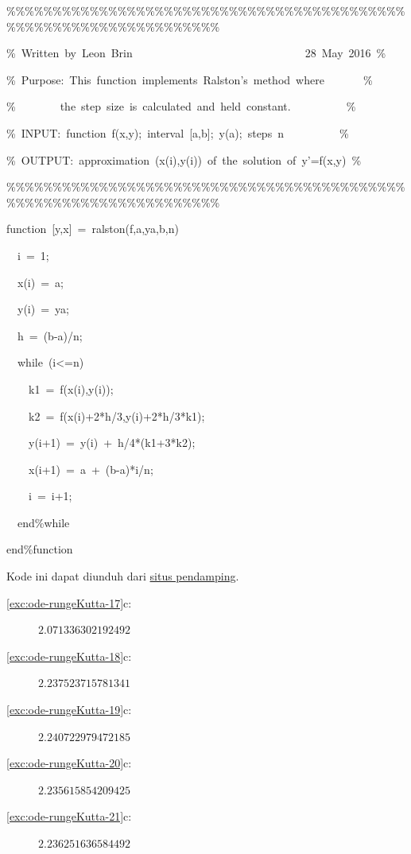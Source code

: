 \begin{lyxcode}
\%\%\%\%\%\%\%\%\%\%\%\%\%\%\%\%\%\%\%\%\%\%\%\%\%\%\%\%\%\%\%\%\%\%\%\%\%\%\%\%\%\%\%\%\%\%\%\%\%\%\%\%\%\%\%\%\%\%\%\%\%\%\%\%\%\%

\%~Written~by~Leon~Brin~~~~~~~~~~~~~~~~~~~~~~~~~~~~~~~28~May~2016~\%

\%~Purpose:~This~function~implements~Ralston's~method~where~~~~~~~\%

\%~~~~~~~~the~step~size~is~calculated~and~held~constant.~~~~~~~~~~\%

\%~INPUT:~function~f(x,y);~interval~{[}a,b{]};~y(a);~steps~n~~~~~~~~~~\%

\%~OUTPUT:~approximation~(x(i),y(i))~of~the~solution~of~y'=f(x,y)~\%

\%\%\%\%\%\%\%\%\%\%\%\%\%\%\%\%\%\%\%\%\%\%\%\%\%\%\%\%\%\%\%\%\%\%\%\%\%\%\%\%\%\%\%\%\%\%\%\%\%\%\%\%\%\%\%\%\%\%\%\%\%\%\%\%\%\%

function~{[}y,x{]}~=~ralston(f,a,ya,b,n)

~~i~=~1;

~~x(i)~=~a;

~~y(i)~=~ya;

~~h~=~(b-a)/n;

~~while~(i<=n)

~~~~k1~=~f(x(i),y(i));

~~~~k2~=~f(x(i)+2{*}h/3,y(i)+2{*}h/3{*}k1);

~~~~y(i+1)~=~y(i)~+~h/4{*}(k1+3{*}k2);

~~~~x(i+1)~=~a~+~(b-a){*}i/n;

~~~~i~=~i+1;

~~end\%while

end\%function~

\textrm{Kode ini dapat diunduh dari \href{http://lqbrin.github.io/tea-time-numerical/ancillaries.html}{situs pendamping}.}
\end{lyxcode}
\begin{description}
\item [{\ref{exc:ode-rungeKutta-17}c:}] $2.071336302192492$
\item [{\ref{exc:ode-rungeKutta-18}c:}] $2.237523715781341$
\item [{\ref{exc:ode-rungeKutta-19}c:}] $2.240722979472185$
\item [{\ref{exc:ode-rungeKutta-20}c:}] $2.235615854209425$
\item [{\ref{exc:ode-rungeKutta-21}c:}] $2.236251636584492$
\end{description}


